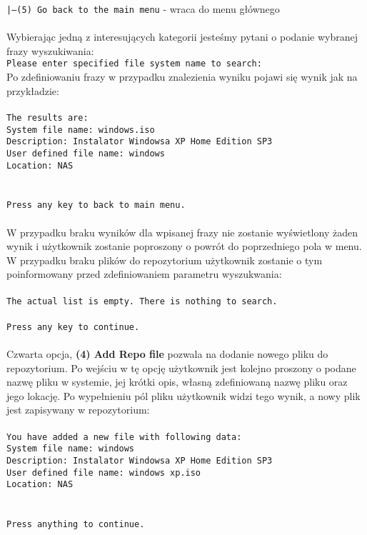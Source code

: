 \documentclass[10pt, a4paper]{article}
\begin{document}
\texttt{|---(5) Go back to the main menu} - wraca do menu głównego\\
\\
Wybierając jedną z interesujących kategorii jesteśmy pytani o podanie wybranej frazy wyszukiwania:\\
\texttt{Please enter specified file system name to search:}\\
Po zdefiniowaniu frazy w przypadku znalezienia wyniku pojawi się wynik jak na przykładzie:\\
\\
\texttt{The results are:\\
System file name: windows.iso\\
Description: Instalator Windowsa XP Home Edition SP3\\
User defined file name: windows\\
Location: NAS\\
\\
\\
Press any key to back to main menu.}\\
\\
W przypadku braku wyników dla wpisanej frazy nie zostanie wyświetlony żaden wynik i użytkownik zostanie poproszony o powrót do poprzedniego pola w menu. W przypadku braku plików do repozytorium użytkownik zostanie o tym poinformowany przed zdefiniowaniem parametru wyszukwania:\\
\\
\texttt{The actual list is empty. There is nothing to search.\\
\\
Press any key to continue.}\\
\\
Czwarta opcja, \textbf{(4) Add Repo file} pozwala na dodanie nowego pliku do repozytorium. Po wejściu w tę opcję użytkownik jest kolejno proszony o podane nazwę pliku w systemie, jej krótki opis, własną zdefiniowaną nazwę pliku oraz jego lokację. Po wypełnieniu pól pliku użytkownik widzi tego wynik, a nowy plik jest zapisywany w repozytorium:\\
\\
\texttt{You have added a new file with following data:\\
System file name: windows\\
Description: Instalator Windowsa XP Home Edition SP3\\
User defined file name: windows xp.iso\\
Location: NAS\\
\\
\\
Press anything to continue.}\\
\end{document}
